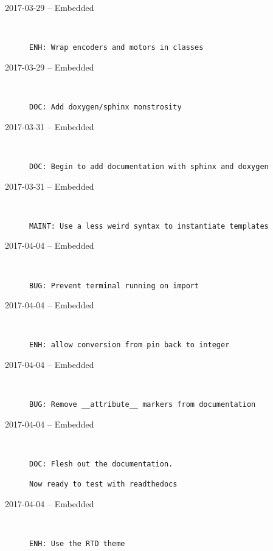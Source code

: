 \begin{description}
  \item[2017-03-29 -- Embedded] \hfill \
\begin{lstlisting}
ENH: Wrap encoders and motors in classes
\end{lstlisting}


  \item[2017-03-29 -- Embedded] \hfill \
\begin{lstlisting}
DOC: Add doxygen/sphinx monstrosity
\end{lstlisting}


  \item[2017-03-31 -- Embedded] \hfill \
\begin{lstlisting}
DOC: Begin to add documentation with sphinx and doxygen
\end{lstlisting}


  \item[2017-03-31 -- Embedded] \hfill \
\begin{lstlisting}
MAINT: Use a less weird syntax to instantiate templates
\end{lstlisting}


  \item[2017-04-04 -- Embedded] \hfill \
\begin{lstlisting}
BUG: Prevent terminal running on import
\end{lstlisting}


  \item[2017-04-04 -- Embedded] \hfill \
\begin{lstlisting}
ENH: allow conversion from pin back to integer
\end{lstlisting}


  \item[2017-04-04 -- Embedded] \hfill \
\begin{lstlisting}
BUG: Remove __attribute__ markers from documentation
\end{lstlisting}


  \item[2017-04-04 -- Embedded] \hfill \
\begin{lstlisting}
DOC: Flesh out the documentation.

Now ready to test with readthedocs
\end{lstlisting}


  \item[2017-04-04 -- Embedded] \hfill \
\begin{lstlisting}
ENH: Use the RTD theme
\end{lstlisting}



\end{description}
